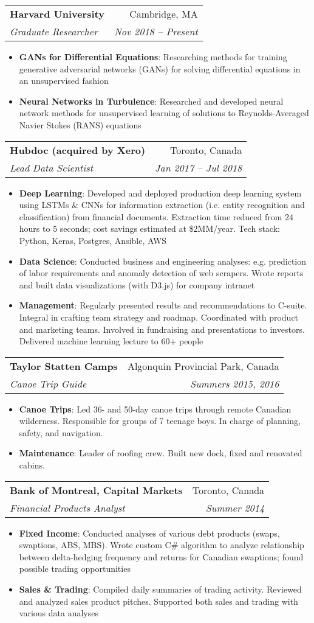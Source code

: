 \documentclass[letterpaper,11pt]{article}
\makeatletter
\newcommand{\resumeItem}[2]{
  \item\small{
    \textbf{#1}{: #2 \vspace{-2pt}}
  }
}
\newcommand{\resumeSubheading}[4]{
  \vspace{-1pt}\item
    \begin{tabular*}{0.97\textwidth}[t]{l@{\extracolsep{\fill}}r}
      \textbf{#1} & #2 \\
      \textit{\small#3} & \textit{\small #4} \\
    \end{tabular*}\vspace{-5pt}
}
\newcommand{\resumeItemListStart}{\begin{itemize}}
\newcommand{\resumeItemListEnd}{\end{itemize}\vspace{-5pt}}
\makeatother
\begin{document}
  \resumeSubheading
    {Harvard University}{Cambridge, MA}
    {Graduate Researcher}{Nov 2018 -- Present}
    \resumeItemListStart
      \resumeItem{GANs for Differential Equations}
        {Researching methods for training generative adversarial networks (GANs) for solving differential equations
         in an unsupervised fashion}
      \resumeItem{Neural Networks in Turbulence}
         {Researched and developed neural network methods for unsupervised learning of solutions to
         Reynolds-Averaged Navier Stokes (RANS) equations}
    \resumeItemListEnd

    \resumeSubheading
      {Hubdoc (acquired by Xero)}{Toronto, Canada}
      {Lead Data Scientist}{Jan 2017 -- Jul 2018}
      \resumeItemListStart
        \resumeItem{Deep Learning}
          {Developed and deployed production deep learning system using LSTMs \& CNNs for information extraction
          (i.e. entity recognition and classification) from financial documents. Extraction time reduced from 24 hours
          to 5 seconds; cost savings estimated at \$2MM/year. Tech stack: Python, Keras, Postgres, Ansible, AWS}
        \resumeItem{Data Science}
          {Conducted business and engineering analyses: e.g. prediction of labor requirements and anomaly detection of web
          scrapers. Wrote reports and built data visualizations (with D3.js) for company intranet}
        \resumeItem{Management}
          {Regularly presented results and recommendations to C-suite. Integral in crafting team strategy and
          roadmap. Coordinated with product and marketing teams. Involved in fundraising and presentations to
          investors. Delivered machine learning lecture to 60+ people}
      \resumeItemListEnd

    \resumeSubheading
      {Taylor Statten Camps}{Algonquin Provincial Park, Canada}
      {Canoe Trip Guide}{Summers 2015, 2016}
      \resumeItemListStart
        \resumeItem{Canoe Trips}
          {Led 36- and 50-day canoe trips through remote Canadian wilderness. Responsible for groups of 7 teenage boys.
           In charge of planning, safety, and navigation.}
        \resumeItem{Maintenance}
          {Leader of roofing crew. Built new dock, fixed and renovated cabins.}
      \resumeItemListEnd

    \resumeSubheading
      {Bank of Montreal, Capital Markets}{Toronto, Canada}
      {Financial Products Analyst}{Summer 2014}
      \resumeItemListStart
        \resumeItem{Fixed Income}
          {Conducted analyses of various debt products (swaps, swaptions, ABS, MBS). Wrote custom C\# algorithm
          to analyze relationship between delta-hedging frequency and returns for Canadian swaptions;
          found possible trading opportunities}
        \resumeItem{Sales \& Trading}
          {Compiled daily summaries of trading activity. Reviewed and analyzed sales product pitches. Supported
          both sales and trading with various data analyses}
      \resumeItemListEnd
\end{document}
